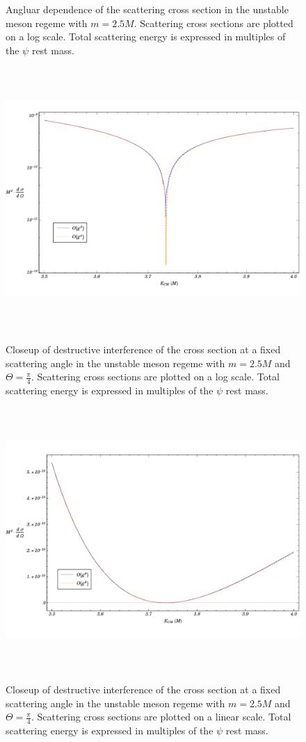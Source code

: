 \documentclass{article}
\begin{document}
\begin{figure}
\begin{center}
\vspace*{-1cm}
\caption{Angluar dependence of the scattering cross section in the unstable meson regeme with $m = 2.5 M$. Scattering cross sections are plotted on a log scale. Total scattering energy is expressed in multiples of the $\psi$ rest mass.} 
\label{unstable-angular}
\end{center}
\end{figure} 


\begin{figure}
\begin{center}
\includegraphics[width=15cm, height=10cm]{AntiResonance}
\caption{Closeup of destructive interference of the cross section at a fixed scattering angle in the unstable meson regeme with $m = 2.5 M$ and $\Theta = \frac{\pi}{4}$. Scattering cross sections are plotted on a log scale. Total scattering energy is expressed in multiples of the $\psi$ rest mass.} 
\label{AntiResonance}
\includegraphics[width=15cm, height=10cm]{NoLogAntiResonance}
\caption{Closeup of destructive interference of the cross section at a fixed scattering angle in the unstable meson regeme with $m = 2.5 M$ and $\Theta = \frac{\pi}{4}$. Scattering cross sections are plotted on a linear scale. Total scattering energy is expressed in multiples of the $\psi$ rest mass.} 
\label{NoLogAntiResonance}
\end{center}
\end{figure}
\end{document}
